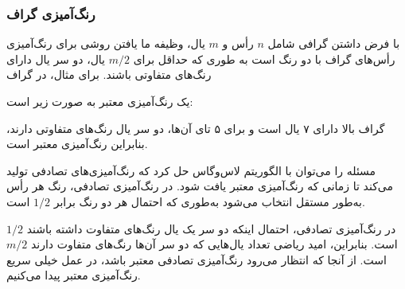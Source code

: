 \subsubsection{رنگ‌آمیزی گراف}


با فرض داشتن گرافی شامل $n$ رأس و $m$ یال،
وظیفه ما یافتن روشی برای رنگ‌آمیزی رأس‌های
گراف با دو رنگ است به طوری که
حداقل برای $m/2$ یال، دو سر یال دارای
رنگ‌های متفاوتی باشند.
برای مثال، در گراف
\begin{center}
\end{center}
یک رنگ‌آمیزی معتبر به صورت زیر است:
\begin{center}
\end{center}
گراف بالا دارای ۷ یال است و برای ۵ تای آن‌ها،
دو سر یال رنگ‌های متفاوتی دارند،
بنابراین رنگ‌آمیزی معتبر است.

مسئله را می‌توان با الگوریتم لاس‌وگاس حل کرد
که رنگ‌آمیزی‌های تصادفی تولید می‌کند تا زمانی که رنگ‌آمیزی معتبر
یافت شود.
در رنگ‌آمیزی تصادفی، رنگ هر رأس به‌طور
مستقل انتخاب می‌شود به‌طوری که احتمال
هر دو رنگ برابر $1/2$ است.

در رنگ‌آمیزی تصادفی، احتمال اینکه دو سر
یک یال رنگ‌های متفاوت داشته باشند $1/2$ است.
بنابراین، امید ریاضی تعداد یال‌هایی که دو سر آن‌ها
رنگ‌های متفاوت دارند $m/2$ است.
از آنجا که انتظار می‌رود رنگ‌آمیزی تصادفی معتبر باشد،
در عمل خیلی سریع رنگ‌آمیزی معتبر پیدا می‌کنیم.